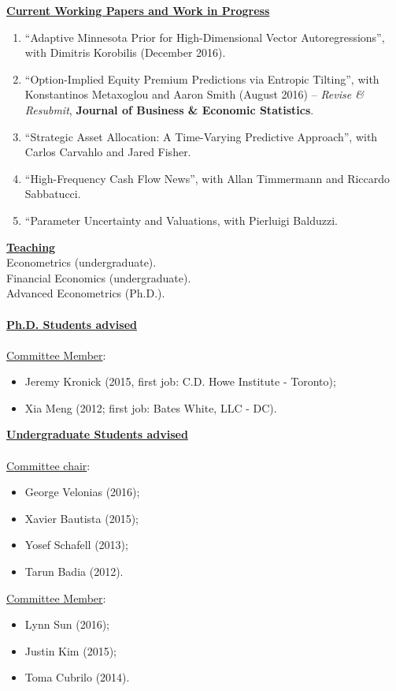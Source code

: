 \documentclass[12pt]{article}
\begin{document}
\underline{\textbf{Current Working Papers and Work in Progress}}
\begin{enumerate}
	\setcounter{enumi}{\theenumTemp}
	\item ``Adaptive Minnesota Prior for High-Dimensional Vector Autoregressions'', with Dimitris Korobilis (December 2016).
	\item ``Option-Implied Equity Premium Predictions via Entropic Tilting'', with Konstantinos Metaxoglou  and Aaron Smith (August 2016) -- \textit{Revise \& Resubmit}, \textbf{Journal of Business \& Economic Statistics}.
	\item ``Strategic Asset Allocation: A Time-Varying Predictive Approach'', with Carlos Carvahlo and Jared Fisher.
	\item ``High-Frequency Cash Flow News'', with Allan Timmermann and Riccardo Sabbatucci.
	\item ``Parameter Uncertainty and Valuations, with Pierluigi Balduzzi.
	
\end{enumerate}

\underline{\textbf{Teaching}}\\
Econometrics (undergraduate).\\
Financial Economics (undergraduate). \\
Advanced Econometrics (Ph.D.). \\ \\
\underline{\textbf{Ph.D. Students advised}} \\ \\
\underline{Committee Member}: 
\begin{itemize}
	\item Jeremy Kronick (2015, first job: C.D. Howe Institute - Toronto);
	\item Xia Meng (2012; first job: Bates White, LLC - DC). 
\end{itemize}
\underline{\textbf{Undergraduate Students advised}} \\ \\
\underline{Committee chair}: 
\begin{itemize}
	\item George Velonias (2016);
	\item Xavier Bautista (2015);
	\item Yosef Schafell (2013);
	\item Tarun Badia (2012). 
\end{itemize}
\underline{Committee Member}: 
\begin{itemize}
	\item Lynn Sun (2016);
	\item Justin Kim (2015);
	\item Toma Cubrilo (2014).
\end{itemize}
\end{document}
